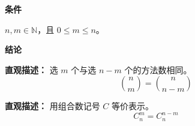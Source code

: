 \begin{statementbox}
	\textbf{\textcolor{CStatement}{条件}}
	\begin{description}[style=nextline, leftmargin=2.8em, labelsep=0.5em, itemsep=0.35em]
		\item[\textbf{\textcolor{CStatement}{条件 1（范围限制）：}}] $n,m \in \mathbb{N}$，且 $0 \le m \le n$。
	\end{description}

	\textbf{\textcolor{CStatement}{结论}}
	\begin{description}[style=nextline, leftmargin=2.8em, labelsep=0.5em, itemsep=0.45em]
		\item[\textbf{\textcolor{CStatement}{结论一（对称公式）：}}]
			\textbf{\textcolor{CStatement}{直观描述：}}
			选 $m$ 个与选 $n-m$ 个的方法数相同。
			\[
				\binom{n}{m} = \binom{n}{n-m}
			\]

		\item[\textbf{\textcolor{CStatement}{推广结论（常见变形）：}}]
			\textbf{\textcolor{CStatement}{直观描述：}}
			用组合数记号 $C$ 等价表示。
			\[
				C_n^m = C_n^{n-m}
			\]
	\end{description}
\end{statementbox}
